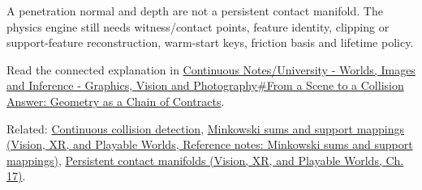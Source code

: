 \hypertarget{appendix-aef6177f7b3f-contact-generation-is-later}{}

A penetration normal and depth are not a persistent contact manifold. The physics engine still needs witness/contact points, feature identity, clipping or support-feature reconstruction, warm-start keys, friction basis and lifetime policy.

Read the connected explanation in \hyperref[03-visual-computing-i-ch020-from-a-scene-to-a-collision-answer-geometry-as-a-chain-of-contracts]{Continuous Notes/University - Worlds, Images and Inference - Graphics, Vision and Photography\#From a Scene to a Collision Answer: Geometry as a Chain of Contracts}.

Related: \hyperref[appendix-66956ed6c753]{Continuous collision detection}, \href{../07-Vision-XR-and-Playable-Worlds/main.pdf\#nameddest=appendix-215ac7099a82}{Minkowski sums and support mappings (Vision, XR, and Playable Worlds, Reference notes: Minkowski sums and support mappings)}, \href{../07-Vision-XR-and-Playable-Worlds/main.pdf\#nameddest=06-engine-ii-ch046-complete-persistent-contact-implementation-and-cache-policy}{Persistent contact manifolds (Vision, XR, and Playable Worlds, Ch. 17)}.
